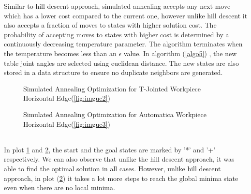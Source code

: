 Similar to hill descent approach, simulated annealing accepts any next move which has a lower cost compared to the current one, however unlike hill descent it also accepts a fraction of moves to states with higher solution cost. The probability of accepting moves to states with higher cost is determined by a continuously decreasing temperature parameter. 
The algorithm terminates when the temperature becomes less than an $\epsilon$ value. In algorithm (\ref{algo5}) , the new table joint angles are selected using euclidean distance. The new states are also stored in a data structure to ensure no duplicate neighbors are generated.
\begin{figure}[!ht] %
	\centering
	\caption{Simulated Annealing Optimization for T-Jointed Workpiece Horizontal Edge(\ref{fig:imguc2})}
	\label{fig:SA1}
\end{figure}
\begin{figure}[!ht] %
	\centering
	\caption{Simulated Annealing Optimization for Automatica Workpiece Horizontal Edge(\ref{fig:imguc3})}
	\label{fig:SA2}
\end{figure}\\
In plot \ref{fig:SA1} and \ref{fig:SA2}, the start and the goal states are  marked by '*' and '+' respectively. We can also observe that unlike the hill descent approach, it was able to find the optimal solution in all cases. However, unlike hill descent approach, in plot (\ref{fig:SA2}) it takes a lot more steps to reach the global minima state even when there are no local minima. 

